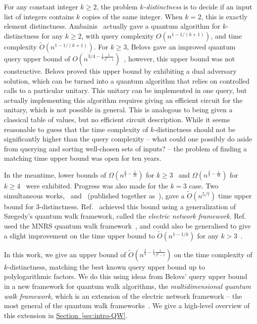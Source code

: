 \documentclass{article}
\renewcommand{\sec}[1]{\hyperref[sec:#1]{Section~\ref*{sec:#1}}}
\renewcommand{\>}{\rangle}
\newcommand{\<}{\langle}
\renewcommand{\(}{\left(}
\renewcommand{\)}{\right)}
\begin{document}
For any constant integer $k\geq 2$, the problem \emph{$k$-distinctness} is to decide if an input list of integers contains $k$ copies of the same integer. When $k=2$, this is exactly element distinctness. Ambainis~\cite{ambainis2004QWalkForElementDist} actually gave a quantum algorithm for $k$-distinctness for any $k\geq 2$, with query complexity $O(n^{1-1/(k+1)})$, and time complexity $\widetilde{O}(n^{1-1/(k+1)})$. For $k\geq 3$, Belovs gave an improved quantum query upper bound of $O(n^{3/4-\frac{1}{4}\frac{1}{2^k-1}})$~\cite{belovs2012kDist}, however, this upper bound was not constructive. Belovs proved this upper bound by exhibiting a dual adversary solution, which can be turned into a quantum algorithm that relies on controlled calls to a particular unitary. This unitary can be implemented in one query, but actually implementing this algorithm requires giving an efficient circuit for the unitary, which is not possible in general. This is analogous to being given a classical table of values, but no efficient circuit description. While it seems reasonable to guess that the time complexity of $k$-distinctness should not be significantly higher than the query complexity -- what could one possibly do aside from querying and sorting well-chosen sets of inputs? -- the problem of finding a matching time upper bound was open for ten years. 


In the meantime, lower bounds of $\Omega(n^{\frac{3}{4}-\frac{1}{2k}})$ for $k\geq 3$~\cite{bun2018PolyMethodStrikesBack} and $\Omega(n^{\frac{3}{4}-\frac{1}{4k}})$ for $k\geq 4$~\cite{mande2020kDistLB} were exhibited. Progress was also made for the $k=3$ case. Two simultaneous works,~\cite{belovs2013ElectricWalks} and~\cite{childs2013arXivTimeEfficientQW3Distintness} (published together as~\cite{belovs2013TimeEfficientQW3Distintness}),
gave a $\widetilde{O}(n^{5/7})$ time upper bound for 3-distinctness. Ref.~\cite{belovs2013ElectricWalks} achieved this bound using a generalization of Szegedy's quantum walk framework, called the \emph{electric network framework}. Ref.~\cite{childs2013arXivTimeEfficientQW3Distintness} used the MNRS quantum walk framework~\cite{magniez2006SearchQuantumWalk}, and could also be generalised to give a slight improvement on the time upper bound to $\widetilde{O}(n^{1-1/k})$ for any $k>3$~\cite{jeffery2014thesis}. 

In this work, we give an upper bound of $\widetilde{O}(n^{\frac{3}{4}-\frac{1}{4}\frac{1}{2^k-1}})$ on the time complexity of $k$-distinctness, matching the best known query upper bound up to polylogarithmic factors. We do this using ideas from Belovs' query upper bound in a new framework for quantum walk algorithms, the \emph{multidimensional quantum walk framework}, which is an extension of the electric network framework -- the most general of the quantum walk frameworks~\cite{apers2019UnifiedFrameworkQWSearch}. We give a high-level overview of this extension in \sec{intro-QW}. 
\end{document}
